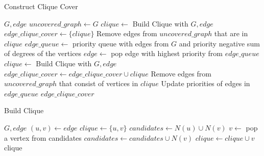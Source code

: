 \begin{algorithm}
\caption{Construct Clique Cover}
\begin{algorithmic}[1]
\REQUIRE $G, edge$
\STATE $uncovered\_graph\gets G$
\STATE $clique\gets$ Build Clique with $G, edge$
\STATE $edge\_clique\_cover\gets \{clique\}$
\STATE Remove edges from $uncovered\_graph$ that are in $clique$
\STATE $edge\_queue\gets$ priority queue with edges from $G$ and priority negative sum of degrees of the vertices
    \STATE $edge\gets$ pop edge with highest priority from $edge\_queue$
    \STATE $clique\gets$ Build Clique with $G, edge$
    \STATE $edge\_clique\_cover\gets edge\_clique\_cover\cup {clique}$
    \STATE Remove edges from $uncovered\_graph$ that consist of vertices in $clique$
    \STATE Update priorities of edges in $edge\_queue$
\ENDWHILE
\RETURN $edge\_clique\_cover$
\end{algorithmic}
\end{algorithm}

\begin{algorithm}
\caption{Build Clique}
\begin{algorithmic}[1]
\REQUIRE $G, edge$
\STATE $(u, v)\gets edge$
\STATE $clique\gets \{u, v\}$
\STATE $candidates\gets N(u)\cup N(v)$
    \STATE $v\gets$ pop a vertex from candidates
        \STATE $candidates\gets candidates\cup N(v)$
        \STATE $clique\gets clique\cup {v}$
    \ENDIF
\ENDWHILE
\RETURN clique
\end{algorithmic}
\end{algorithm}

